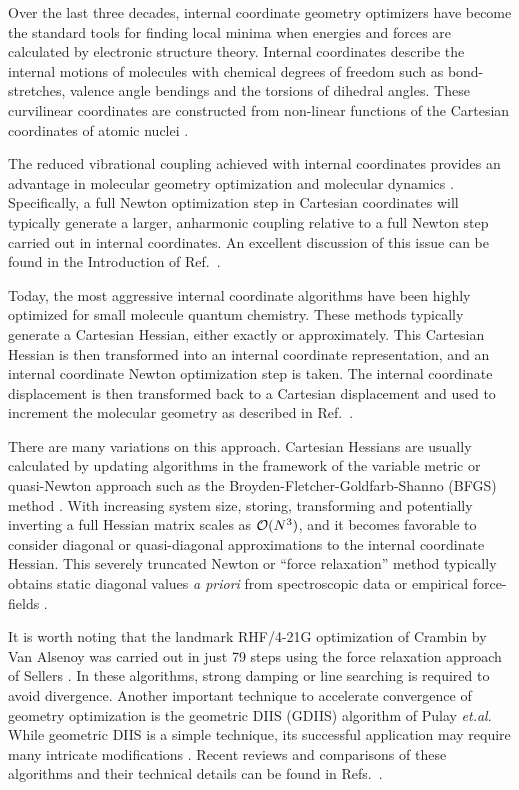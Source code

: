 \documentclass[prl,aps,preprint,superbib,12pt]{revtex4}
\begin{document}
Over the last three decades, internal coordinate geometry optimizers have become the standard 
tools for finding local minima when energies and forces are calculated by electronic structure 
theory. Internal coordinates describe the internal motions of molecules 
with chemical degrees of freedom such as bond-stretches, valence angle bendings and the torsions 
of dihedral angles. These curvilinear coordinates are constructed from non-linear functions of the 
Cartesian coordinates of atomic nuclei \cite{EWilson55}.

The reduced vibrational coupling achieved with internal coordinates provides an advantage 
in molecular geometry optimization \cite{PPulay77} and molecular dynamics \cite{PPulay02}.
Specifically, a full Newton optimization step in Cartesian coordinates will typically generate a larger, 
anharmonic coupling relative to a full Newton step carried out in internal coordinates.
An excellent discussion of this issue can be found in the Introduction of Ref.~.

Today, the most aggressive internal coordinate algorithms have been highly optimized for 
small molecule quantum chemistry.  These methods typically generate a Cartesian Hessian,
either exactly or approximately. This Cartesian Hessian is then transformed into an internal 
coordinate representation, and an internal coordinate Newton optimization step is taken. The internal 
coordinate 
displacement
is then transformed back to a Cartesian displacement and used to increment the 
molecular geometry as described in Ref.~.

There are many variations on this approach.  Cartesian Hessians are usually calculated by updating 
algorithms in the framework of the variable metric or quasi-Newton approach such as the  
Broyden-Fletcher-Goldfarb-Shanno (BFGS) method \cite{RFletcher81}.  With increasing system size, storing,
transforming and potentially inverting a full Hessian matrix scales as ${\cal O}(N^3)$, and it becomes
favorable to consider diagonal or 
quasi-diagonal
approximations to the internal coordinate Hessian. 
This severely truncated Newton or  ``force relaxation'' method typically obtains static diagonal values 
{\em a priori} from spectroscopic data or empirical force-fields 
\cite{PPulay69,GFogarasi79,GFogarasi92,PPulay77,HSellers78,CVanAlsenoy98,RLindh95}.

It is worth noting that the landmark RHF/4-21G optimization of Crambin by Van Alsenoy \cite{CVanAlsenoy98}
was carried out in just 79 steps using the force relaxation approach of Sellers \cite{HSellers78}.
In these algorithms, strong damping \cite{HSellers78} or line searching \cite{HSchlegel82}
is required to avoid divergence. Another important technique to accelerate convergence of 
geometry optimization is the geometric DIIS (GDIIS) \cite{PPulay84} 
algorithm of Pulay
{\it et.al}. While geometric DIIS is a simple 
technique, its successful application may require many intricate modifications \cite{OFarkas02}.  
Recent reviews and comparisons of these algorithms and their technical details can be found in 
Refs.~.
\end{document}
